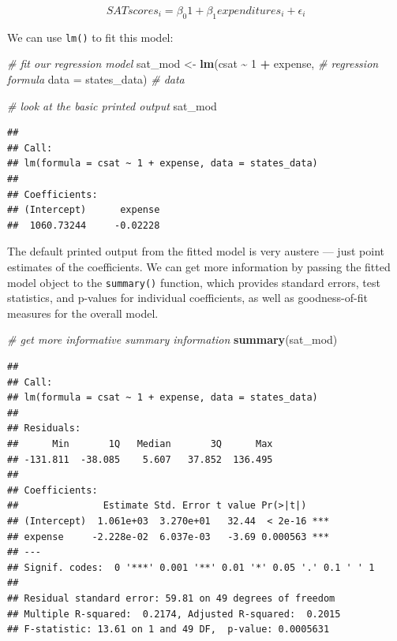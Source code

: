 \documentclass[
]{book}
\newenvironment{Shaded}{\begin{snugshade}}{\end{snugshade}}
\newcommand{\CommentTok}[1]{\textcolor[rgb]{0.56,0.35,0.01}{\textit{#1}}}
\newcommand{\DataTypeTok}[1]{\textcolor[rgb]{0.13,0.29,0.53}{#1}}
\newcommand{\DecValTok}[1]{\textcolor[rgb]{0.00,0.00,0.81}{#1}}
\newcommand{\KeywordTok}[1]{\textcolor[rgb]{0.13,0.29,0.53}{\textbf{#1}}}
\newcommand{\NormalTok}[1]{#1}
\newcommand{\OperatorTok}[1]{\textcolor[rgb]{0.81,0.36,0.00}{\textbf{#1}}}
\newcommand{\StringTok}[1]{\textcolor[rgb]{0.31,0.60,0.02}{#1}}
\begin{document}
\begin{alert}

\[
SATscores_i = \beta_{0}1 + \beta_1expenditures_i + \epsilon_i
\]

\end{alert}

We can use \texttt{lm()} to fit this model:

\begin{Shaded}
\begin{Highlighting}[]
  \CommentTok{\# fit our regression model}
\NormalTok{  sat\_mod \textless{}{-}}\StringTok{ }\KeywordTok{lm}\NormalTok{(csat }\OperatorTok{\textasciitilde{}}\StringTok{ }\DecValTok{1} \OperatorTok{+}\StringTok{ }\NormalTok{expense, }\CommentTok{\# regression formula}
                \DataTypeTok{data =}\NormalTok{ states\_data) }\CommentTok{\# data }

  \CommentTok{\# look at the basic printed output}
\NormalTok{  sat\_mod}
\end{Highlighting}
\end{Shaded}

\begin{verbatim}
## 
## Call:
## lm(formula = csat ~ 1 + expense, data = states_data)
## 
## Coefficients:
## (Intercept)      expense  
##  1060.73244     -0.02228
\end{verbatim}

The default printed output from the fitted model is very austere --- just point estimates of the coefficients. We can get more information by passing the fitted model object to the \texttt{summary()} function, which provides standard errors, test statistics, and p-values for individual coefficients, as well as goodness-of-fit measures for the overall model.

\begin{Shaded}
\begin{Highlighting}[]
  \CommentTok{\# get more informative summary information }
  \KeywordTok{summary}\NormalTok{(sat\_mod)}
\end{Highlighting}
\end{Shaded}

\begin{verbatim}
## 
## Call:
## lm(formula = csat ~ 1 + expense, data = states_data)
## 
## Residuals:
##      Min       1Q   Median       3Q      Max 
## -131.811  -38.085    5.607   37.852  136.495 
## 
## Coefficients:
##               Estimate Std. Error t value Pr(>|t|)    
## (Intercept)  1.061e+03  3.270e+01   32.44  < 2e-16 ***
## expense     -2.228e-02  6.037e-03   -3.69 0.000563 ***
## ---
## Signif. codes:  0 '***' 0.001 '**' 0.01 '*' 0.05 '.' 0.1 ' ' 1
## 
## Residual standard error: 59.81 on 49 degrees of freedom
## Multiple R-squared:  0.2174, Adjusted R-squared:  0.2015 
## F-statistic: 13.61 on 1 and 49 DF,  p-value: 0.0005631
\end{verbatim}
\end{document}
